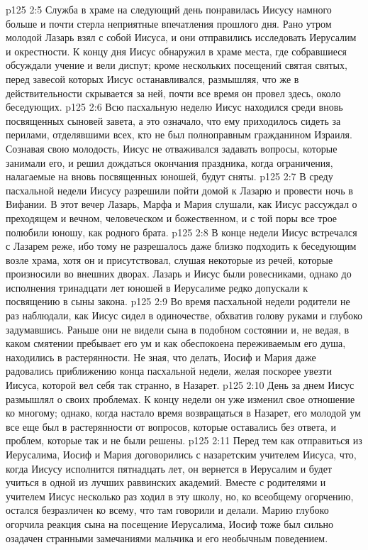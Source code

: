 \vs p125 2:5 Служба в храме на следующий день понравилась Иисусу намного больше и почти стерла неприятные впечатления прошлого дня. Рано утром молодой Лазарь взял с собой Иисуса, и они отправились исследовать Иерусалим и окрестности. К концу дня Иисус обнаружил в храме места, где собравшиеся обсуждали учение и вели диспут; кроме нескольких посещений святая святых, перед завесой которых Иисус останавливался, размышляя, что же в действительности скрывается за ней, почти все время он провел здесь, около беседующих.
\vs p125 2:6 Всю пасхальную неделю Иисус находился среди вновь посвященных сыновей завета, а это означало, что ему приходилось сидеть за перилами, отделявшими всех, кто не был полноправным гражданином Израиля. Сознавая свою молодость, Иисус не отваживался задавать вопросы, которые занимали его, и решил дождаться окончания праздника, когда ограничения, налагаемые на вновь посвященных юношей, будут сняты.
\vs p125 2:7 В среду пасхальной недели Иисусу разрешили пойти домой к Лазарю и провести ночь в Вифании. В этот вечер Лазарь, Марфа и Мария слушали, как Иисус рассуждал о преходящем и вечном, человеческом и божественном, и с той поры все трое полюбили юношу, как родного брата.
\vs p125 2:8 В конце недели Иисус встречался с Лазарем реже, ибо тому не разрешалось даже близко подходить к беседующим возле храма, хотя он и присутствовал, слушая некоторые из речей, которые произносили во внешних дворах. Лазарь и Иисус были ровесниками, однако до исполнения тринадцати лет юношей в Иерусалиме редко допускали к посвящению в сыны закона.
\vs p125 2:9 Во время пасхальной недели родители не раз наблюдали, как Иисус сидел в одиночестве, обхватив голову руками и глубоко задумавшись. Раньше они не видели сына в подобном состоянии и, не ведая, в каком смятении пребывает его ум и как обеспокоена переживаемым его душа, находились в растерянности. Не зная, что делать, Иосиф и Мария даже радовались приближению конца пасхальной недели, желая поскорее увезти Иисуса, которой вел себя так странно, в Назарет.
\vs p125 2:10 День за днем Иисус размышлял о своих проблемах. К концу недели он уже изменил свое отношение ко многому; однако, когда настало время возвращаться в Назарет, его молодой ум все еще был в растерянности от вопросов, которые оставались без ответа, и проблем, которые так и не были решены.
\vs p125 2:11 Перед тем как отправиться из Иерусалима, Иосиф и Мария договорились с назаретским учителем Иисуса, что, когда Иисусу исполнится пятнадцать лет, он вернется в Иерусалим и будет учиться в одной из лучших раввинских академий. Вместе с родителями и учителем Иисус несколько раз ходил в эту школу, но, ко всеобщему огорчению, остался безразличен ко всему, что там говорили и делали. Марию глубоко огорчила реакция сына на посещение Иерусалима, Иосиф тоже был сильно озадачен странными замечаниями мальчика и его необычным поведением.
